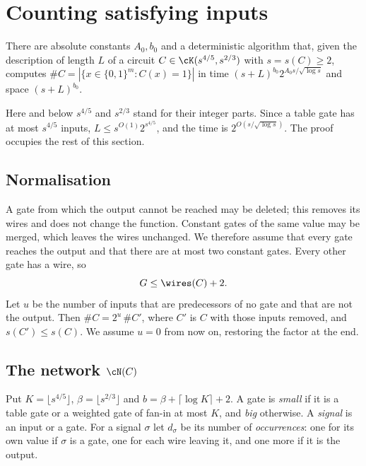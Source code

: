 \section{Counting satisfying inputs}\label{sec:counting}

\begin{theorem}\label{thm:counting}
There are absolute constants $A_0,b_0$ and a deterministic algorithm that,
given the description of length $L$ of a circuit $C\in\cK(s^{4/5},s^{2/3})$ with
$s=s(C)\ge2$, computes $\#C=|\{x\in\{0,1\}^m:C(x)=1\}|$ in time
$(s+L)^{b_0}2^{A_0s/\sqrt{\log s}}$ and space $(s+L)^{b_0}$.
\end{theorem}

Here and below $s^{4/5}$ and $s^{2/3}$ stand for their integer parts. Since a
table gate has at most $s^{4/5}$ inputs, $L\le s^{O(1)}2^{s^{4/5}}$, and the time
is $2^{O(s/\sqrt{\log s})}$. The proof occupies the rest of this section.

\subsection{Normalisation}
A gate from which the output cannot be reached may be deleted; this removes its
wires and does not change the function. Constant gates of the same value may
be merged, which leaves the wires unchanged. We therefore assume that every
gate reaches the output and that there are at most two constant gates. Every
other gate has a wire, so
\begin{equation}\label{eq:gates}
G\le\wires(C)+2.
\end{equation}
Let $u$ be the number of inputs that are predecessors of no gate and that are
not the output. Then $\#C=2^u\,\#C'$, where $C'$ is $C$ with those inputs
removed, and $s(C')\le s(C)$. We assume $u=0$ from now on, restoring the factor
at the end.

\subsection{The network $\cN(C)$}
Put $K=\lfloor s^{4/5}\rfloor$, $\beta=\lfloor s^{2/3}\rfloor$ and
$b=\beta+\lceil\log K\rceil+2$. A gate is \emph{small} if it is a table gate or a
weighted gate of fan-in at most $K$, and \emph{big} otherwise. A \emph{signal}
is an input or a gate. For a signal $\sigma$ let $d_\sigma$ be its number of
\emph{occurrences}: one for its own value if $\sigma$ is a gate, one for each
wire leaving it, and one more if it is the output.

